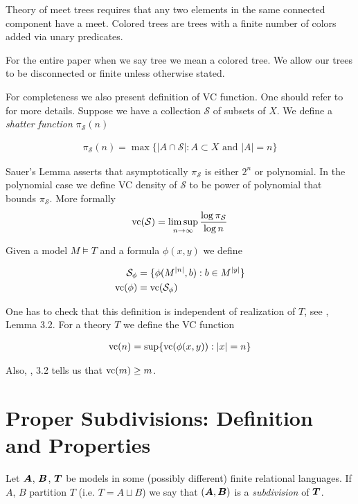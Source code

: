 \documentclass{amsart}
\DeclareMathOperator{\TT}{\boldface T}
\DeclareMathOperator{\A}{\boldface A}
\DeclareMathOperator{\B}{\boldface B}
\newcommand{\CS}{\mathcal S}
\begin{document}
Theory of meet trees requires that any two elements in the same connected component have a meet. Colored trees are trees with a finite number of colors added via unary predicates.

For the entire paper when we say tree we mean a colored tree. We allow our trees to be disconnected or finite unless otherwise stated.

For completeness we also present definition of VC function.
One should refer to \cite{vc_density} for more details.
Suppose we have a collection $\CS$ of subsets of $X$. We define a \emph{shatter function} $\pi_\CS(n)$

\begin{align*}
	\pi_\CS(n) = \max \{|A \cap \CS| : A \subset X \text{ and } |A| = n\}
\end{align*}

Sauer's Lemma asserts that asymptotically $\pi_\CS$ is either $2^n$ or polynomial.
In the polynomial case we define VC density of $\CS$ to be power of polynomial that bounds $\pi_\CS$.
More formally 
\begin{align*}
	\vc(\CS) = \limsup_{n \to \infty}\frac{\log \pi_\CS}{\log n}
\end{align*}

Given a model $M \models T$ and a formula $\phi(x, y)$ we define 

\begin{align*}
	\CS_\phi &= \{\phi(M^{|n|}, b) : b \in M^{|y|}\} \\
	\vc(\phi) &=  \vc(\CS_\phi)
\end{align*}

One has to check that this definition is independent of realization of $T$, see \cite{vc_density}, Lemma 3.2. For a theory $T$ we define the VC function

\begin{align*}
	\operatorname{vc}(n) = \sup \{\operatorname{vc}(\phi(x, y)) : |x| = n\}
\end{align*}

Also, \cite{vc_density}, 3.2 tells us that $\operatorname{vc}(m) \geq m$.

\section{Proper Subdivisions: Definition and Properties}
\begin{Definition}
	Let $\A$, $\B$, $\TT$ be models in some (possibly different) finite relational languages. If $A$, $B$ partition $T$ (i.e. $T = A \sqcup B$) we say that $(\A, \B)$ is a \emph{subdivision} of $\TT$.
\end{Definition}
\end{document}
